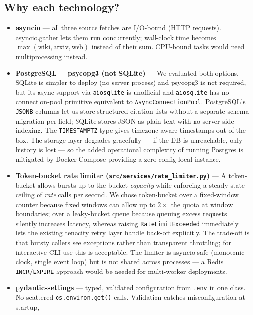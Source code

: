 \documentclass[12pt,a4paper]{article}
\begin{document}
\subsection{Why each technology?}

\begin{itemize}
  \item \textbf{asyncio} — all three source fetches are I/O-bound (HTTP requests). asyncio.gather
    lets them run concurrently; wall-clock time becomes \(\max(\text{wiki}, \text{arxiv}, \text{web})\)
    instead of their sum. CPU-bound tasks would need multiprocessing instead.
  \item \textbf{PostgreSQL + psycopg3 (not SQLite)} — We evaluated both options.
    SQLite is simpler to deploy (no server process) and psycopg3 is not required, but its
    async support via \texttt{aiosqlite} is unofficial and \texttt{aiosqlite} has no connection-pool
    primitive equivalent to \texttt{AsyncConnectionPool}.  PostgreSQL's \texttt{JSONB} columns
    let us store structured citation lists without a separate schema migration per field;
    SQLite stores JSON as plain text with no server-side indexing.  The \texttt{TIMESTAMPTZ}
    type gives timezone-aware timestamps out of the box.  The storage layer degrades
    gracefully — if the DB is unreachable, only history is lost — so the added operational
    complexity of running Postgres is mitigated by Docker Compose providing a zero-config
    local instance.
  \item \textbf{Token-bucket rate limiter (\texttt{src/services/rate\_limiter.py})} —
    A token-bucket allows bursts up to the bucket \emph{capacity} while enforcing a
    steady-state ceiling of \emph{rate} calls per second.  We chose token-bucket over a
    fixed-window counter because fixed windows can allow up to $2\times$ the quota at
    window boundaries; over a leaky-bucket queue because queuing excess requests silently
    increases latency, whereas raising \texttt{RateLimitExceeded} immediately lets the
    existing tenacity retry layer handle back-off explicitly.  The trade-off is that bursty
    callers see exceptions rather than transparent throttling; for interactive CLI use this
    is acceptable.  The limiter is asyncio-safe (monotonic clock, single event loop) but is
    not shared across processes — a Redis \texttt{INCR}/\texttt{EXPIRE} approach would be
    needed for multi-worker deployments.
  \item \textbf{pydantic-settings} — typed, validated configuration from \texttt{.env} in one class.
    No scattered \texttt{os.environ.get()} calls. Validation catches misconfiguration at startup,

\end{itemize}
\end{document}
